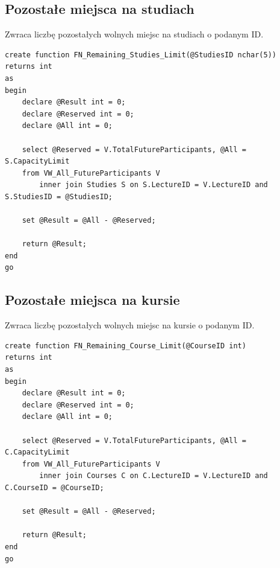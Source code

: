 \documentclass[11pt,a4paper]{article}
\begin{document}
\subsection{Pozostałe miejsca na studiach}
Zwraca liczbę pozostałych wolnych miejsc na studiach o podanym ID.
\begin{Verbatim}[breaklines=true]
create function FN_Remaining_Studies_Limit(@StudiesID nchar(5))
returns int
as
begin
    declare @Result int = 0;
    declare @Reserved int = 0;
    declare @All int = 0;

    select @Reserved = V.TotalFutureParticipants, @All = S.CapacityLimit
    from VW_All_FutureParticipants V 
        inner join Studies S on S.LectureID = V.LectureID and S.StudiesID = @StudiesID;

    set @Result = @All - @Reserved;

    return @Result;
end
go
\end{Verbatim}

\subsection{Pozostałe miejsca na kursie}
Zwraca liczbę pozostałych wolnych miejsc na kursie o podanym ID.
\begin{Verbatim}[breaklines=true]
create function FN_Remaining_Course_Limit(@CourseID int)
returns int
as
begin
    declare @Result int = 0;
    declare @Reserved int = 0;
    declare @All int = 0;

    select @Reserved = V.TotalFutureParticipants, @All = C.CapacityLimit
    from VW_All_FutureParticipants V 
        inner join Courses C on C.LectureID = V.LectureID and C.CourseID = @CourseID;

    set @Result = @All - @Reserved;

    return @Result;
end
go
\end{Verbatim}
\end{document}

